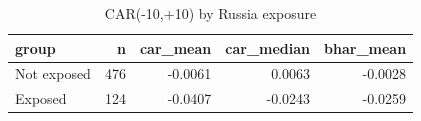 \begin{table}
\caption{CAR(-10,+10) by Russia exposure}
\begin{tabular}{lrrrr}
\toprule
group & n & car_mean & car_median & bhar_mean \\
\midrule
Not exposed & 476 & -0.0061 & 0.0063 & -0.0028 \\
Exposed & 124 & -0.0407 & -0.0243 & -0.0259 \\
\bottomrule
\end{tabular}
\end{table}
